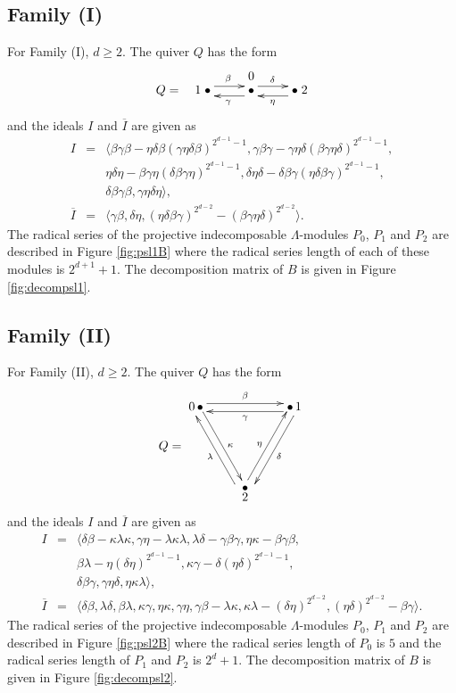 \documentclass{amsart}
\theoremstyle{plain}
\theoremstyle{definition}
\theoremstyle{remark}
\begin{document}
\subsection{Family (I)}
\label{ss:psl1A}
For Family (I), $d\ge 2$. The quiver $Q$ has the form
$$
\xymatrix @R=-.2pc {
&0&\\
Q= \quad 1\; \bullet \ar@<.8ex>[r]^(.66){\beta} \ar@<1ex>[r];[]^(.34){\gamma}
& \bullet \ar@<.8ex>[r]^(.44){\delta} \ar@<1ex>[r];[]^(.56){\eta} & \bullet\; 2}
$$
and the ideals $I$ and $\overline{I}$  are given as
\begin{eqnarray*}
I&=&\langle \beta\gamma\beta-\eta\delta\beta
(\gamma\eta\delta\beta)^{2^{d-1}-1},\gamma\beta\gamma-\gamma\eta\delta (\beta\gamma\eta
\delta)^{2^{d-1}-1}, \\ 
&&\eta\delta\eta-\beta\gamma\eta(\delta\beta\gamma\eta)^{2^{d-1}-1},
\delta\eta\delta-\delta\beta\gamma(\eta\delta\beta\gamma)^{2^{d-1}-1},\\
&&\delta\beta\gamma\beta,\gamma\eta\delta\eta\rangle,\\
\overline{I}&=&\langle \gamma\beta,\delta\eta,(\eta\delta\beta\gamma)^{2^{d-2}}-(\beta\gamma\eta\delta
)^{2^{d-2}}\rangle.
\end{eqnarray*}
The radical series of the projective indecomposable $\Lambda$-modules 
$P_0$, $P_1$ and $P_2$ are described in  Figure \ref{fig:psl1B} 
where the radical series length of each of these modules is $2^{d+1}+1$. 
The decomposition matrix of $B$ is given in Figure \ref{fig:decompsl1}.

\subsection{Family (II)}
\label{ss:psl2A}
For Family (II), $d\ge 2$. The quiver $Q$ has the form
$$Q=\vcenter{\xymatrix  {
 0\,\bullet \ar@<.7ex>[rr]^{\beta} \ar@<.8ex>[rr];[]^{\gamma}\ar@<.7ex>[rdd]^{\kappa} \ar@<.8ex>[rdd];[]^{\lambda}
&&\bullet\ar@<.7ex>[ldd]^{\delta} \ar@<.8ex>[ldd];[]^{\eta}\,1\\&&\\ &
{\genfrac{}{}{0pt}{}{{\mbox{\normalsize $\bullet$}}}{{\mbox{\normalsize $2$}}}}& }}$$
and the ideals $I$ and $\overline{I}$ are given as
\begin{eqnarray*}
I&=&\langle \delta\beta-\kappa\lambda\kappa,
\gamma\eta-\lambda\kappa\lambda,
\lambda\delta-\gamma\beta\gamma,
\eta\kappa-\beta\gamma\beta,\\
&&\beta\lambda-\eta(\delta\eta)^{2^{d-1}-1},\kappa\gamma-\delta(\eta\delta)^{2^{d-1}-1},\\
&&\delta\beta\gamma, \gamma\eta\delta, \eta\kappa\lambda
\rangle,\\
\overline{I}&=&\langle \delta\beta,\lambda\delta,\beta\lambda,\kappa\gamma,\eta\kappa,\gamma\eta,
\gamma\beta-\lambda\kappa,\kappa\lambda-(\delta\eta)^{2^{d-2}},(\eta\delta)^{2^{d-2}}-\beta\gamma
\rangle.
\end{eqnarray*}
The radical series of the projective indecomposable $\Lambda$-modules $P_0$, $P_1$ and $P_2$
are described in  Figure \ref{fig:psl2B}
where the radical series length of $P_0$ is $5$ and the radical series length of $P_1$ and $P_2$
is $2^{d}+1$. 
The decomposition matrix of $B$ is given in Figure \ref{fig:decompsl2}.
\end{document}
